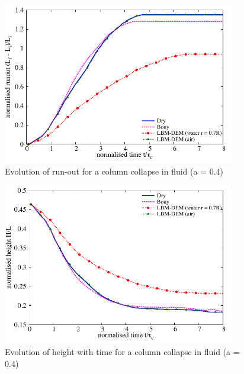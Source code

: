 \begin{figure}[htpb]
\centering
\includegraphics[width=0.9\textwidth]{Runout_a04f}
\caption{Evolution of run-out for a column collapse in fluid (a = 0.4)}
\label{fig:Runout_a04f}
\end{figure}

\begin{figure}[htpb]
\centering
\includegraphics[width=0.9\textwidth]{Height_a04f}
\caption{Evolution of height with time for a column collapse in fluid 
(a = 0.4)}
\label{fig:Height_a04f}
\end{figure}

